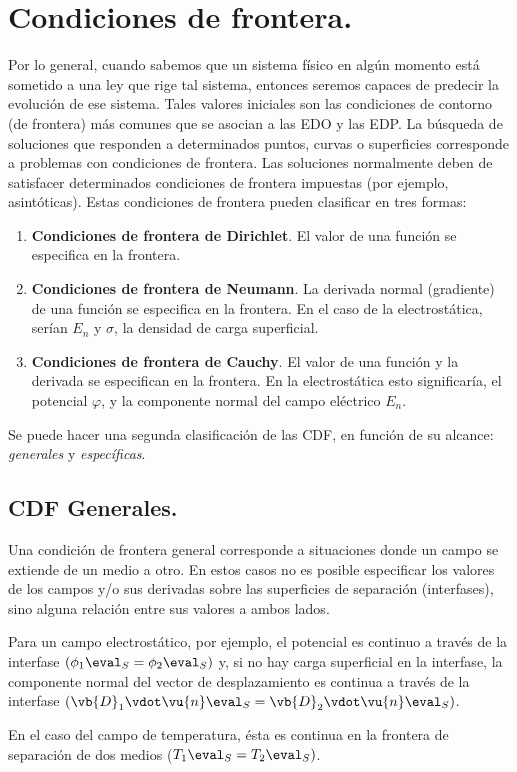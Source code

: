 \section{Condiciones de frontera.}
Por lo general, cuando sabemos que un sistema físico en algún momento está sometido a una ley que rige tal sistema, entonces seremos capaces de predecir la evolución de ese sistema. Tales valores iniciales son las condiciones de contorno (de frontera) más comunes que se asocian a las EDO y las EDP. La búsqueda de soluciones que responden a determinados puntos, curvas o superficies corresponde a problemas con condiciones de frontera. Las soluciones normalmente deben de satisfacer determinados condiciones de frontera impuestas (por ejemplo, asintóticas). Estas condiciones de frontera pueden clasificar en tres formas:
\begin{enumerate}
\item \textbf{Condiciones de frontera de Dirichlet}. El valor de una función se especifica en la frontera.
\item \textbf{Condiciones de frontera de Neumann}. La derivada normal (gradiente) de una función se especifica en la frontera. En el caso de la electrostática, serían $E_{n}$ y $\sigma$, la densidad de carga superficial.
\item \textbf{Condiciones de frontera de Cauchy}. El valor de una función y la derivada se especifican en la frontera. En la electrostática esto significaría, el potencial $\varphi$, y la componente normal del campo eléctrico $E_{n}$.
\end{enumerate}
Se puede hacer una segunda clasificación de las CDF, en función de su alcance: \emph{generales} y \emph{específicas}.
\subsection*{CDF Generales.}
Una condición de frontera general corresponde a situaciones donde un campo se extiende de un medio a otro. En estos casos no es posible especificar los valores de los campos y/o sus derivadas sobre las superficies de separación (interfases), sino alguna relación entre sus valores a ambos lados.
\par
Para un campo electrostático, por ejemplo, el potencial es continuo a través de la interfase $(\phi_{1} \eval_{S} = \phi_{2} \eval_{S})$ y, si no hay carga superficial en la interfase, la componente normal del vector de desplazamiento es continua a través de la interfase $(\vb{D}_{1} \vdot \vu{n} \eval_{S} = \vb{D}_{2} \vdot \vu{n} \eval_{S})$.
\par
En el caso del campo de temperatura, ésta es continua en la frontera de separación de dos medios ($T_{1} \eval_{S} = T_{2} \eval_{S})$.

